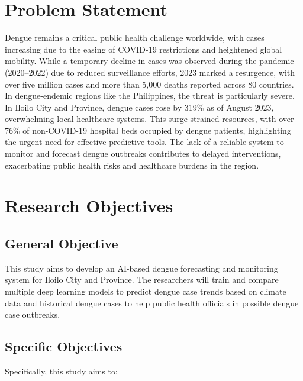 \section{Problem Statement}
Dengue remains a critical public health challenge worldwide, with cases increasing due to the easing of COVID-19 restrictions and heightened global mobility. While a temporary decline in cases was observed during the pandemic (2020–2022) due to reduced surveillance efforts, 2023 marked a resurgence, with over five million cases and more than 5,000 deaths reported across 80 countries. In dengue-endemic regions like the Philippines, the threat is particularly severe. In Iloilo City and Province, dengue cases rose by 319\% as of August 2023, overwhelming local healthcare systems. This surge strained resources, with over 76\% of non-COVID-19 hospital beds occupied by dengue patients, highlighting the urgent need for effective predictive tools. The lack of a reliable system to monitor and forecast dengue outbreaks contributes to delayed interventions, exacerbating public health risks and healthcare burdens in the region. 

\section{Research Objectives}
\label{sec:researchobjectives}

\subsection{General Objective}
\label{sec:generalobjective}

This study aims to develop an AI-based dengue forecasting and monitoring system for Iloilo City and Province. 
The researchers will train and compare multiple deep learning models to predict dengue case trends based on climate data and 
historical dengue cases to help public health officials in possible dengue case outbreaks.


\subsection{Specific Objectives}
\label{sec:specificobjectives}

%
%

Specifically, this study aims to:


